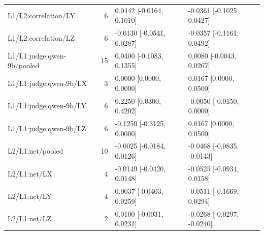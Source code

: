 \begin{longtable}{@{}p{1.8in}rl l@{}}
L1/\allowbreak L2:correlation/\allowbreak LY & 6 & 0.0442 [-0.0164, 0.1010] & -0.0361 [-0.1025, 0.0427]\\
L1/\allowbreak L2:correlation/\allowbreak LZ & 6 & -0.0130 [-0.0541, 0.0287] & -0.0357 [-0.1161, 0.0492]\\
L1/\allowbreak L1:judge:qwen-9b/\allowbreak pooled & 15 & 0.0400 [-0.1083, 0.1355] & 0.0080 [-0.0043, 0.0267]\\
L1/\allowbreak L1:judge:qwen-9b/\allowbreak LX & 3 & 0.0000 [0.0000, 0.0000] & 0.0167 [0.0000, 0.0500]\\
L1/\allowbreak L1:judge:qwen-9b/\allowbreak LY & 6 & 0.2250 [0.0300, 0.4202] & -0.0050 [-0.0150, 0.0000]\\
L1/\allowbreak L1:judge:qwen-9b/\allowbreak LZ & 6 & -0.1250 [-0.3125, 0.0000] & 0.0167 [0.0000, 0.0500]\\
L2/\allowbreak L1:net/\allowbreak pooled & 10 & -0.0025 [-0.0184, 0.0126] & -0.0468 [-0.0835, -0.0143]\\
L2/\allowbreak L1:net/\allowbreak LX & 4 & -0.0149 [-0.0420, 0.0148] & -0.0525 [-0.0934, 0.0158]\\
L2/\allowbreak L1:net/\allowbreak LY & 4 & 0.0037 [-0.0403, 0.0259] & -0.0511 [-0.1669, 0.0294]\\
L2/\allowbreak L1:net/\allowbreak LZ & 2 & 0.0100 [-0.0031, 0.0231] & -0.0268 [-0.0297, -0.0240]\\

\end{longtable}
